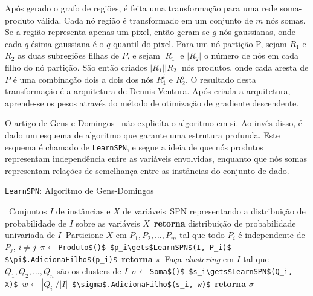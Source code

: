 \documentclass[12pt]{article}
\theoremstyle{plain}
\numberwithin{equation}{section}
\newcommand{\code}[1]{\lstinline[mathescape=true]{#1}}
\newcommand{\mcode}[1]{\lstinline[mathescape]!#1!}
\begin{document}
Após gerado o grafo de regiões, é feita uma transformação para uma rede soma-produto válida. Cada
nó região é transformado em um conjunto de $m$ nós somas. Se a região representa apenas um pixel,
então geram-se $g$ nós gaussianas, onde cada $q$-ésima gaussiana é o $q$-quantil do pixel. Para um
nó partição P, sejam $R_1$ e $R_2$ as duas subregiões filhas de $P$, e sejam $|R_1|$ e $|R_2|$ o
número de nós em cada filho do nó partição. São então criados $|R_1| |R_2|$ nós produtos, onde cada
aresta de $P$ é uma combinação dois a dois dos nós $R_1^i$ e $R_2^j$. O resultado desta
transformação é a arquitetura de Dennis-Ventura. Após criada a arquitetura, aprende-se os pesos
através do método de otimização de gradiente descendente.

O artigo de Gens e Domingos~\cite{gens-domingos} não explicíta o algoritmo em si. Ao invés disso, é
dado um esquema de algoritmo que garante uma estrutura profunda. Este esquema é chamado de
\code{LearnSPN}, e segue a ideia de que nós produtos representam independência entre as variáveis
envolvidas, enquanto que nós somas representam relações de semelhança entre as instâncias do
conjunto de dado.

\begin{algorithm}[H]
  \caption*{\code{LearnSPN}: Algoritmo de Gens-Domingos}
  \begin{algorithmic}[1]
    \Require\, Conjuntos $I$ de instâncias e $X$ de variáveis
    \Ensure\,SPN representando a distribuição de probabilidade de $I$ sobre as variáveis $X$
      \State\,\textbf{retorna} distribuição de probabilidade univariada de $I$
    \Else%
      \State\,Particione $X$ em $P_1,P_2,\ldots,P_m$ tal que todo $P_i$ é independente de $P_j$,
      $i\neq j$
        \State\,$\pi\gets$\mcode{Produto$()$}
          \State\,\mcode{$p_i\gets$LearnSPN$(I, P_i)$}
          \State\,\mcode{$\pi$.AdicionaFilho$(p_i)$}
        \EndFor%
        \State\,\textbf{retorna} $\pi$
      \Else%
        \State\,Faça \textit{clustering} em $I$ tal que $Q_1,Q_2,\ldots,Q_n$ são os clusters de $I$
        \State\,$\sigma\gets$\mcode{Soma$()$}
          \State\,\mcode{$s_i\gets$LearnSPN$(Q_i, X)$}
          \State\,$w\gets |Q_i|/|I|$
          \State\,\mcode{$\sigma$.AdicionaFilho$(s_i, w)$} 
        \EndFor%
        \State\,\textbf{retorna} $\sigma$
      \EndIf%
    \EndIf%
  \end{algorithmic}
\end{algorithm}
\end{document}
